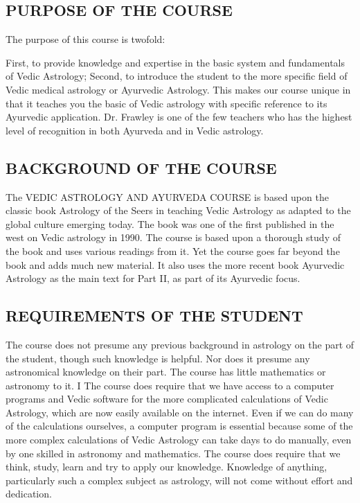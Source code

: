 \subsection{PURPOSE OF THE COURSE}
  The purpose of this course is twofold:

First, to provide knowledge and expertise in the basic system and fundamentals of Vedic Astrology;
Second, to introduce the student to the more specific field of Vedic medical astrology or Ayurvedic Astrology.
  This makes our course unique in that it teaches you the basic of Vedic astrology with specific reference to its Ayurvedic application. Dr. Frawley is one of the few teachers who has the highest level of recognition in both Ayurveda and in Vedic astrology.  

\subsection{BACKGROUND OF THE COURSE}
 The VEDIC ASTROLOGY AND AYURVEDA COURSE is based upon the classic book Astrology of the Seers in teaching Vedic Astrology as adapted to the global culture emerging today. The book was one of the first published in the west on Vedic astrology in 1990.   The course is based upon a thorough study of the book and uses various readings from it.  Yet the course goes far beyond the book and adds much new material. It also uses the more recent book Ayurvedic Astrology as the main text for Part II, as part of its Ayurvedic focus.  

\subsection{REQUIREMENTS OF THE STUDENT}
  The course does not presume any previous background in astrology on the part of the student, though such knowledge is helpful. Nor does it presume any astronomical knowledge on their part. The course has little mathematics or astronomy to it. I   The course does require that we have access to a computer programs and Vedic software for the more complicated calculations of Vedic Astrology, which are now easily available on the internet. Even if we can do many of the calculations ourselves, a computer program is essential because some of the more complex calculations of Vedic Astrology can take days to do manually, even by one skilled in astronomy and mathematics.   The course does require that we think, study, learn and try to apply our knowledge. Knowledge of anything, particularly such a complex subject as astrology, will not come without effort and dedication.  

